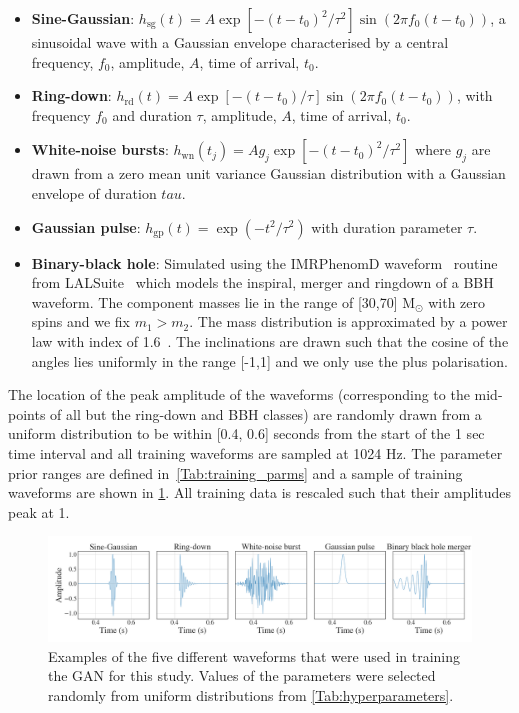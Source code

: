\documentclass[12pt]{iopart}
\begin{document}
%
\begin{itemize}
%
\item {\bf Sine-Gaussian}: $h_{\text{sg}}(t) = A \exp\left[ - (t-t_{0})^2 /
\tau^2 \right] \sin (2 \pi f_0 (t-t_0))$, a sinusoidal wave with a Gaussian
envelope characterised by a central frequency, $f_0$, amplitude, $A$, time of arrival, $t_{0}$. 
%
\item {\bf Ring-down}: $h_{\text{rd}}(t) = A \exp \left[-{(t-t_0)} / {\tau}
\right] \sin(2 \pi f_0 (t-t_0))$, with frequency $f_0$ and duration $\tau$, amplitude, $A$, time of arrival, $t_{0}$. 
%
\item {\bf White-noise bursts}: $h_{\text{wn}}(t_j) = Ag_j\exp\left[ -
(t-t_{0})^2 / \tau^2 \right]$ where $g_j$ are drawn from a zero mean unit
variance Gaussian distribution with a Gaussian envelope of duration $tau$.
%
\item {\bf Gaussian pulse}: $h_{\text{gp}}(t) = \exp(-t^2 / \tau^2)$ with
duration parameter $\tau$.
%
\item {\bf Binary-black hole}: Simulated using the IMRPhenomD
waveform~\cite{Khan_2016} routine from LALSuite~\cite{lalsuite} which models
the inspiral, merger and ringdown of a \ac{BBH} waveform. The component masses
lie in the range of [30,70] $\textrm{M}_{\odot}$ with zero spins and we fix
$m_1>m_2$. The mass distribution is approximated by a power law with
index of 1.6~\cite{Abbott_2019}. The inclinations are drawn
such that the cosine of the angles lies uniformly in the range [-1,1] and we only use the plus polarisation.
%
\end{itemize}
%
The location of the peak amplitude of the waveforms (corresponding to the
mid-points of all but the ring-down and \ac{BBH} classes) are randomly drawn from a uniform distribution to
be within [0.4, 0.6] seconds from the start of the 1 sec time interval and all
training waveforms are sampled at 1024 Hz.  The parameter prior ranges are
defined in~\cref{Tab:training_parms} and a sample of training waveforms are shown in \cref{fig:training_waveforms}. All training data is rescaled such that their amplitudes peak at 1.

\begin{figure}
    \centering
    \includegraphics[width=\textwidth]{figures/training-sample.png}
    \caption{Examples of the five different waveforms that were used in training the \ac{GAN} for this study. Values of the parameters were selected randomly from uniform distributions from \cref{Tab:hyperparameters}.}
    \label{fig:training_waveforms}
\end{figure}
\end{document}
